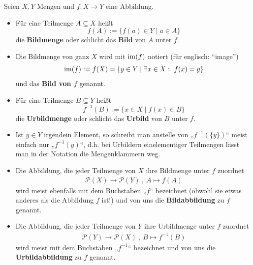 \begin{de} \label{bildmenge}
	Seien $X,Y$ Mengen und $f: X \to Y$ eine Abbildung.
\begin{itemize}
 \item Für eine Teilmenge $A\subseteq X$ heißt
\[ f(A) := \{ f(a) \in Y \mid a\in A \} \]
die \textbf{Bildmenge} oder schlicht das \textbf{Bild} von $A$ unter $f$. 
\item Die Bildmenge von ganz $X$ wird mit $\operatorname{im}(f)$ notiert (für englisch: ``image'')
\[ \operatorname{im}(f) := f(X) = \{y\in Y\mid \exists x\in X:\ f(x)=y  \} \]
und das \textbf{Bild von $f$} genannt.
\item Für eine Teilmenge $B\subseteq Y$ heißt
\[ f^{-1}(B) := \{ x \in X \mid f(x)\in B \} \]
die \textbf{Urbildmenge} oder schlicht das \textbf{Urbild} von $B$ unter $f$.
\item Ist $y\in Y$ irgendein Element, so schreibt man anstelle von „$f^{-1}(\{y\})$“ meist einfach nur „$f^{-1}(y)$“, d.h. bei Urbildern einelementiger Teilmengen lässt man in der Notation die Mengenklammern weg.
\item Die Abbildung, die jeder Teilmenge von $X$ ihre Bildmenge unter $f$ zuordnet
\begin{align*}
 \mathcal{P}(X) \to \mathcal{P}(Y) \ , \ A\mapsto f(A)
\end{align*}
wird meist ebenfalls mit dem Buchstaben „$f$“ bezeichnet (obwohl sie etwas anderes als die Abbildung $f$ ist!) und von uns die \textbf{Bildabbildung} zu $f$ genannt.
\item Die Abbildung, die jeder Teilmenge von $Y$ ihre Urbildmenge unter $f$ zuordnet
\begin{align*}
 \mathcal{P}(Y) \to \mathcal{P}(X) \ , \ B\mapsto f^{-1}(B)
\end{align*}
wird meist mit dem Buchstaben „$f^{-1}$“ bezeichnet und von uns die \textbf{Urbildabbildung} zu $f$ genannt.
\end{itemize}
\end{de}


